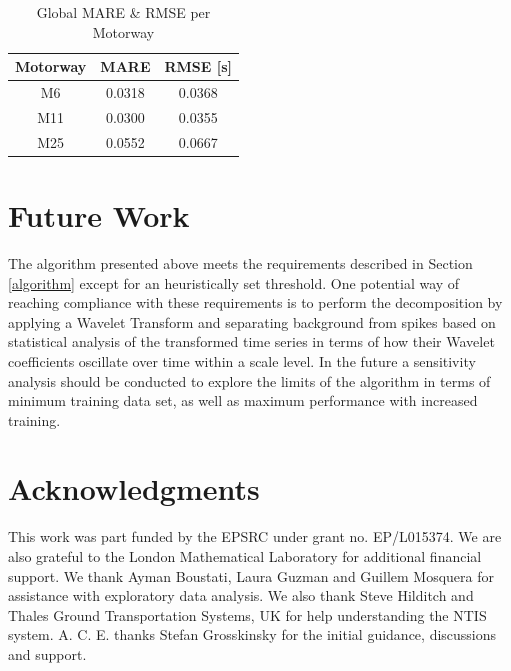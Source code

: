 \documentclass[conference, letterpaper]{IEEEtran}
\begin{document}
\begin{table}[htbp]
	\caption{Global MARE \& RMSE per Motorway}
	\begin{center}
		\begin{tabular}{|c|c|c|}
			\hline
			\textbf{Motorway}&{\textbf{MARE}}&{\textbf{RMSE [s]}} \\
			\hline
			M6& 0.0318& 0.0368\\
			\hline
			M11& 0.0300& 0.0355\\
			\hline
			M25& 0.0552& 0.0667\\
			\hline
		\end{tabular}
		\label{mapeglobal}
	\end{center}
\end{table}

\section{Future Work}
The algorithm presented above meets the requirements described in Section \ref{algorithm} except for an heuristically set threshold. 
One potential way of reaching compliance with these requirements is to perform the decomposition by applying a Wavelet Transform and separating background from spikes based on statistical analysis of the transformed time series in terms of how their Wavelet coefficients oscillate over time within a scale level. 
In the future a sensitivity analysis should be conducted to explore the limits of the algorithm in terms of minimum training data set, as well as maximum performance with increased training.
\section*{Acknowledgments}
This work was part funded by the EPSRC under grant no. EP/L015374. 
We are also grateful to the London Mathematical Laboratory for additional financial support. 
We thank Ayman Boustati, Laura Guzman and Guillem Mosquera for assistance with exploratory data analysis. 
We also thank Steve Hilditch and Thales Ground Transportation Systems, UK for help understanding the NTIS system.  
A. C. E. thanks Stefan Grosskinsky for the initial guidance, discussions and support.
\end{document}
